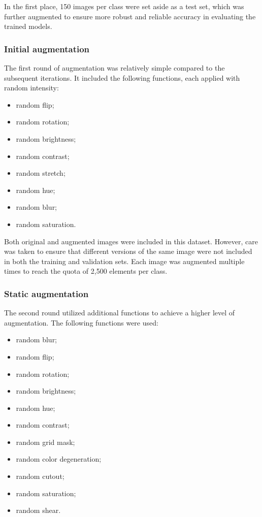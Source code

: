 \documentclass[11pt]{article}
\begin{document}
In the first place, 150 images per class were set aside as a test set, which was further augmented to ensure more robust and reliable accuracy in evaluating the trained models.

\subsubsection{Initial augmentation}

The first round of augmentation was relatively simple compared to the subsequent iterations.
It included the following functions, each applied with random intensity:

\begin{itemize}
    \item random flip;
    \item random rotation;
    \item random brightness;
    \item random contrast;
    \item random stretch;
    \item random hue;
    \item random blur;
    \item random saturation.
\end{itemize}

Both original and augmented images were included in this dataset. 
However, care was taken to ensure that different versions of the same image were not included in both the training and validation sets.
Each image was augmented multiple times to reach the quota of 2,500 elements per class.

\subsubsection{Static augmentation}

The second round utilized additional functions to achieve a higher level of augmentation. 
The following functions were used:

\begin{itemize}
    \item random blur;
    \item random flip;
    \item random rotation;
    \item random brightness;
    \item random hue;
    \item random contrast;
    \item random grid mask;
    \item random color degeneration;
    \item random cutout;
    \item random saturation;
    \item random shear.
\end{itemize}
\end{document}
